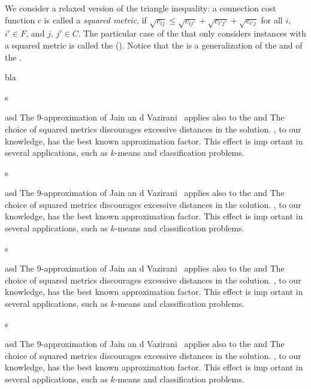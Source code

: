 We consider a relaxed version of the triangle inequality: a connection cost
function $c$ is called a \emph{squared metric}, if
$\sqrt{c_{ij}}\leq\sqrt{c_{ij'}} + \sqrt{c_{i'j'}} + \sqrt{c_{i'j}}$ for all
$i$, $i' \in F$, and $j$, $j' \in C$. The particular case of the \flp that only
considers instances with a squared metric is called the \squmetfacloc (\smflp).
Notice that the \smflp is a generalization of the \seflp and of the \mflp.

bla

s

\item asd The 9-approximation of Jain
an d Vazirani~\cite{JainV01} applies also
  to the \smflp and
  The choice of squared metrics discourages excessive distances in the solution.
  , to our knowledge, has the best known approximation factor.
  This effect is imp
  ortant
   in several applications, such as $k$-means and
  classification problems.

s

\item asd The 9-approximation of Jain
an d Vazirani~\cite{JainV01} applies also
  to the \smflp and
  The choice of squared metrics discourages excessive distances in the solution.
  , to our knowledge, has the best known approximation factor.
  This effect is imp
  ortant
   in several applications, such as $k$-means and
  classification problems.

s

\item asd The 9-approximation of Jain
an d Vazirani~\cite{JainV01} applies also
  to the \smflp and
  The choice of squared metrics discourages excessive distances in the solution.
  , to our knowledge, has the best known approximation factor.
  This effect is imp
  ortant
   in several applications, such as $k$-means and
  classification problems.

s

\item asd The 9-approximation of Jain
an d Vazirani~\cite{JainV01} applies also
  to the \smflp and
  The choice of squared metrics discourages excessive distances in the solution.
  , to our knowledge, has the best known approximation factor.
  This effect is imp
  ortant
   in several applications, such as $k$-means and
  classification problems.

